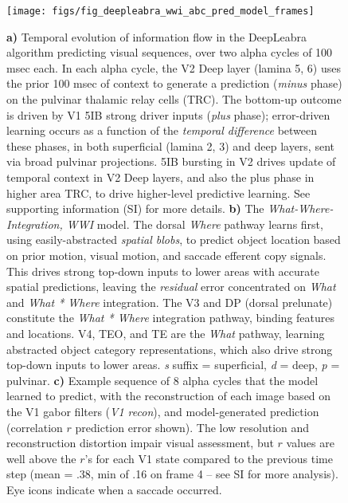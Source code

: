 \documentclass[12pt,twoside,lineno]{pnas-new}  %
\begin{document}
\begin{figure}
  \centering\texttt{[image: figs/fig\_deepleabra\_wwi\_abc\_pred\_model\_frames]}
  \caption{\small  {\bf a)} Temporal evolution of information flow in the DeepLeabra algorithm predicting visual sequences, over two alpha cycles of 100 msec each.   In each alpha cycle, the V2 Deep layer (lamina 5, 6) uses the prior 100 msec of context to generate a prediction ({\em minus} phase) on the pulvinar thalamic relay cells (TRC). The bottom-up outcome is driven by V1 5IB strong driver inputs ({\em plus} phase); error-driven learning occurs as a function of the {\em temporal difference} between these phases, in both superficial (lamina 2, 3) and deep layers, sent via broad pulvinar projections. 5IB bursting in V2 drives update of temporal context in V2 Deep layers, and also the plus phase in higher area TRC, to drive higher-level predictive learning.  See supporting information (SI) for more details. {\bf b)} The {\em What-Where-Integration, WWI} model. The dorsal {\em Where} pathway learns first, using easily-abstracted {\em spatial blobs}, to predict object location based on prior motion, visual motion, and saccade efferent copy signals.  This drives strong top-down inputs to lower areas with accurate spatial predictions, leaving the {\em residual} error concentrated on {\em What} and {\em What * Where} integration.  The V3 and DP (dorsal prelunate) constitute the {\em What * Where} integration pathway, binding features and locations.  V4, TEO, and TE are the {\em What} pathway, learning abstracted object category representations, which also drive strong top-down inputs to lower areas.  {\em s} suffix = superficial, {\em d} = deep, {\em p} = pulvinar. {\bf c)} Example sequence of 8 alpha cycles that the model learned to predict, with the reconstruction of each image based on the V1 gabor filters ({\em V1 recon}), and model-generated prediction (correlation $r$ prediction error shown).  The low resolution and reconstruction distortion impair visual assessment, but $r$ values are well above the $r$'s for each V1 state compared to the previous time step (mean = .38, min of .16 on frame 4 -- see SI for more analysis).  Eye icons indicate when a saccade occurred.}
  \label{fig.model}
\end{figure}
\end{document}
